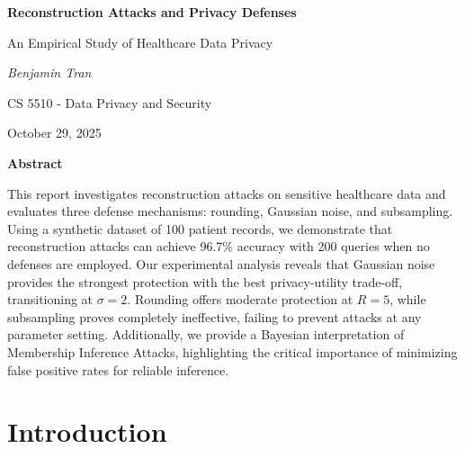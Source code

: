 \documentclass[11pt,letterpaper]{article}
\begin{document}
\begin{titlepage}
    \centering
    \vspace*{2cm}
    
    {\Huge\bfseries Reconstruction Attacks and Privacy Defenses\par}
    \vspace{0.5cm}
    {\Large An Empirical Study of Healthcare Data Privacy\par}
    \vspace{2cm}
    
    {\Large\itshape Benjamin Tran\par}
    \vspace{1cm}
    
    {\large CS 5510 - Data Privacy and Security\par}
    \vspace{0.5cm}
    {\large October 29, 2025\par}
    
    \vfill
    
    {\large \textbf{Abstract}\par}
    \vspace{0.5cm}
    \begin{minipage}{0.8\textwidth}
        \small
        This report investigates reconstruction attacks on sensitive healthcare data and evaluates three defense mechanisms: rounding, Gaussian noise, and subsampling. Using a synthetic dataset of 100 patient records, we demonstrate that reconstruction attacks can achieve 96.7\% accuracy with 200 queries when no defenses are employed. Our experimental analysis reveals that Gaussian noise provides the strongest protection with the best privacy-utility trade-off, transitioning at $\sigma = 2$. Rounding offers moderate protection at $R = 5$, while subsampling proves completely ineffective, failing to prevent attacks at any parameter setting. Additionally, we provide a Bayesian interpretation of Membership Inference Attacks, highlighting the critical importance of minimizing false positive rates for reliable inference.
    \end{minipage}
    
    \vfill
\end{titlepage}

\tableofcontents
\newpage

\section{Introduction}
\end{document}
